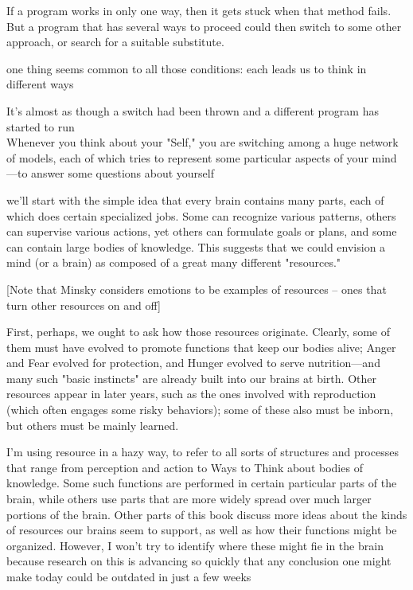 \documentclass[10pt,a4paper]{article}
\begin{document}
If a program works in only one way, then it gets stuck when that
method fails. But a program that has several ways to proceed
could then switch to some other approach, or search for a suitable
substitute. \cite[p.~6]{minsky}

one thing seems common to all those conditions: each leads us to think in different ways \cite[p.~12]{minsky}

It's almost as though a switch had been thrown and a different program has started to run \cite[p.~12]{minsky}
\\
Whenever you think about your "Self," you are switching among a huge network of models, each of which tries to represent some particular aspects of your mind—to answer some questions about yourself \cite[p.~16]{minsky}

we'll start with the simple idea that every brain contains many parts, each of which does certain specialized jobs. Some can recognize various patterns, others can supervise various actions, yet others can formulate goals or plans, and some can contain large bodies of knowledge. This suggests that we could envision a mind (or a brain) as composed of a great many different "resources." \cite[p.~22-23]{minsky}

[Note that Minsky considers emotions to be examples of resources -- ones that turn other resources on and off]

First, perhaps, we ought to ask how those resources originate. Clearly, some of them must have evolved to promote functions that keep our bodies alive; Anger and Fear evolved for protection, and Hunger evolved to serve nutrition—and many such "basic instincts" are already built into our brains at birth. Other resources appear in later years, such as the ones involved with reproduction (which often engages some risky behaviors); some of these also must be inborn, but others must be mainly learned. \cite[p.~24]{minsky}

I'm using resource in a hazy way, to refer to all sorts of structures and processes that range from perception and action to Ways to Think about bodies of knowledge. Some such functions are performed in certain particular parts of the brain, while others use parts that are more widely spread over much larger portions of the brain. Other parts of this book discuss more ideas about the kinds of resources our brains seem to support, as well as how their functions might be organized. However, I won't try to identify where these might fie in the brain because research on this is advancing so quickly that any conclusion one might make today could be outdated in just a few weeks \cite[p.~25]{minsky}
\end{document}
